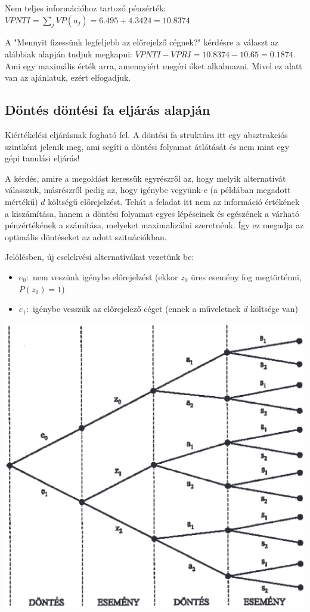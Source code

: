 \documentclass[a4paper,12pt]{article}
\begin{document}
Nem teljes információhoz tartozó pénzérték: $VPNTI = \sum_{j} VP(a_j) = 6.495 + 4.3424 = 10.8374$

A "Mennyit fizessünk legfeljebb az előrejelző cégnek?" kérdésre a választ az alábbiak alapján tudjuk megkapni: $VPNTI - VPRI = 10.8374 - 10.65 = 0.1874$. Ami egy maximális érték arra, amennyiért megéri őket alkalmazni. Mivel ez alatt van az ajánlatuk, ezért elfogadjuk.

\subsection{Döntés döntési fa eljárás alapján}

Kiértékelési eljárásnak fogható fel. A döntési fa struktúra itt egy absztrakciós szintként jelenik meg, ami segíti a döntési folyamat átlátását és nem mint egy gépi tanulási eljárás!

A kérdés, amire a megoldást keressük egyrészről az, hogy melyik alternatívát válasszuk, másrészről pedig az, hogy igénybe vegyünk-e (a példában megadott mértékű) $d$ költségű előrejelzést. Tehát a feladat itt nem az információ értékének a kiszámítása, hanem a döntési folyamat egyes lépéseinek és egészének a várható pénzértékének a számítása, melyeket maximalizálni szeretnénk. Így ez megadja az optimális döntéseket az adott szituációkban.

Jelölésben, új cselekvési alternatívákat vezetünk be: 
\begin{itemize}
\item $e_{0}:$ nem veszünk igénybe előrejelzést (ekkor $z_{0}$ üres esemény fog megtörténni, $P(z_0) = 1$)
\item $e_{1}:$ igénybe vesszük az előrejelező céget (ennek a műveletnek $d$ költsége van)
\end{itemize}

\begin{center}

\includegraphics[scale=0.7]{dectree01}
\\
\end{center}
\end{document}
